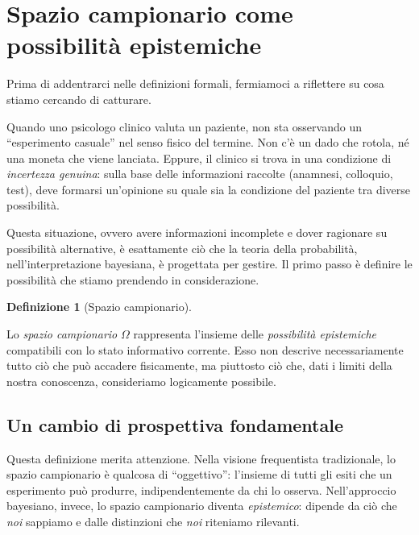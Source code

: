 \documentclass[
  italian,
  letterpaper,
  a4paper,
  11pt,
  open=any]{scrbook}
\theoremstyle{plain}
\theoremstyle{definition}
\theoremstyle{definition}
\newtheorem{definition}{Definizione}[chapter]
\theoremstyle{remark}
\begin{document}
\section{Spazio campionario come possibilità
epistemiche}\label{spazio-campionario-come-possibilituxe0-epistemiche}

Prima di addentrarci nelle definizioni formali, fermiamoci a riflettere
su cosa stiamo cercando di catturare.

Quando uno psicologo clinico valuta un paziente, non sta osservando un
``esperimento casuale'' nel senso fisico del termine. Non c'è un dado
che rotola, né una moneta che viene lanciata. Eppure, il clinico si
trova in una condizione di \emph{incertezza genuina}: sulla base delle
informazioni raccolte (anamnesi, colloquio, test), deve formarsi
un'opinione su quale sia la condizione del paziente tra diverse
possibilità.

Questa situazione, ovvero avere informazioni incomplete e dover
ragionare su possibilità alternative, è esattamente ciò che la teoria
della probabilità, nell'interpretazione bayesiana, è progettata per
gestire. Il primo passo è definire le possibilità che stiamo prendendo
in considerazione.

\begin{definition}[Spazio
campionario]\protect\hypertarget{def-sample-space-bayesian}{}\label{def-sample-space-bayesian}

Lo \emph{spazio campionario} \(\Omega\) rappresenta l'insieme delle
\emph{possibilità epistemiche} compatibili con lo stato informativo
corrente. Esso non descrive necessariamente tutto ciò che può accadere
fisicamente, ma piuttosto ciò che, dati i limiti della nostra
conoscenza, consideriamo logicamente possibile.

\end{definition}

\subsection{Un cambio di prospettiva
fondamentale}\label{un-cambio-di-prospettiva-fondamentale}

Questa definizione merita attenzione. Nella visione frequentista
tradizionale, lo spazio campionario è qualcosa di ``oggettivo'':
l'insieme di tutti gli esiti che un esperimento può produrre,
indipendentemente da chi lo osserva. Nell'approccio bayesiano, invece,
lo spazio campionario diventa \emph{epistemico}: dipende da ciò che
\emph{noi} sappiamo e dalle distinzioni che \emph{noi} riteniamo
rilevanti.
\end{document}
